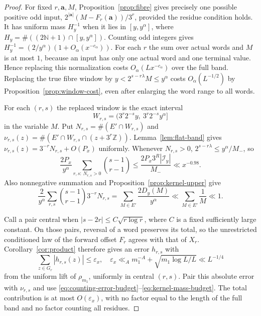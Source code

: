 \documentclass[11pt]{article}
\theoremstyle{remark}\newtheorem{remark}[proposition]{Remark}
\newcommand{\ZZ}{\mathbb Z}
\newcommand{\NN}{\mathbb N}
\begin{document}
\begin{proof}
For fixed $r,\mathbf a,M$, Proposition~\ref{prop:fibre} gives precisely
one possible positive odd input, $2^{|\mathbf a|}(M-F_r(\mathbf a))/3^r$,
provided the residue condition holds. It has uniform mass
$H_y^{-1}$ when it lies in $[y,y^\alpha]$, where
$H_y=\#((2\NN+1)\cap[y,y^\alpha])$.
Counting odd integers gives
$H_y^{-1}=(2/y^\alpha)(1+O_\alpha(x^{-c_\alpha}))$.
For each $r$ the sum over actual words and $M$ is at most $1$, because
an input has only one actual word and one terminal value. Hence replacing
this normalization costs $O_\alpha(Lx^{-c_\alpha})$ over the full band.
Replacing the true fibre window by $y<2^{s-r\lambda}M\le y^\alpha$
costs $O_\alpha(L^{-1/2})$ by Proposition~\ref{prop:window-cost}, even
after enlarging the word range to all words.

For each $(r,s)$ the replaced window is the exact interval
\[
 W_{r,s}=(3^r2^{-s}y,\ 3^r2^{-s}y^\alpha]
\]
in the variable $M$. Put
$N_{r,s}=\#(E'\cap W_{r,s})$ and
$\nu_{r,s}(z)=\#(E'\cap W_{r,s}\cap(z+3^r\ZZ))$.
Lemma~\ref{lem:flat-band} gives
$\nu_{r,s}(z)=3^{-r}N_{r,s}+O(P_x)$ uniformly.
Whenever $N_{r,s}>0$,
$2^{s-r\lambda}\le y^\alpha/M_-$, so
\begin{equation}\label{eq:counting-error-budget}
 \frac{2P_x}{y^\alpha}
 \sum_{r,s:\,N_{r,s}>0}\binom{s-1}{r-1}
 \le\frac{2P_x3^R|\mathcal I_y|}{M_-}\ll x^{-0.98}.
\end{equation}
Also nonnegative summation and Proposition~\ref{prop:kernel-upper} give
\begin{equation}\label{eq:kernel-mass-budget}
 \frac{2}{y^\alpha}\sum_{r,s}\binom{s-1}{r-1}3^{-r}N_{r,s}
 =\sum_{M\in E'}\frac{2D_y(M)}{y^\alpha}
 \ll\sum_{M\in E'}\frac1M\ll1.
\end{equation}

Call a pair central when $|s-2r|\le C\sqrt{r\log r}$, where $C$
is a fixed sufficiently large constant. On those pairs, reversal of a
word preserves its total, so the unrestricted conditioned law of the
forward offset $F_r$ agrees with that of $X_r$. Corollary~\ref{cor:product}
therefore gives an error $h_{r,s}$ with
\[
 \sum_{z\in G_r}|h_{r,s}(z)|\le\varepsilon_x,
 \quad\varepsilon_x\ll_A m_1^{-A}
             +\sqrt{m_1\log L/L}\ll L^{-1/4}
\]
from the uniform lift of $\rho_{m_1}$, uniformly in central $(r,s)$.
Pair this absolute error with $\nu_{r,s}$ and use
\eqref{eq:counting-error-budget}--\eqref{eq:kernel-mass-budget}.
The total contribution is at most $O(\varepsilon_x)$, with no factor
equal to the length of the full band and no factor counting all residues.


\end{proof}
\end{document}
